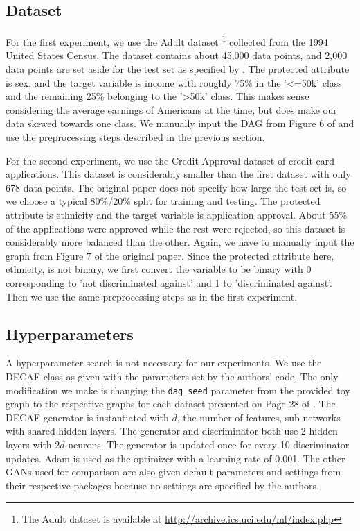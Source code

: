 \subsection{Dataset}

For the first experiment, we use the Adult dataset \footnote{The Adult dataset is available at \url{http://archive.ics.uci.edu/ml/index.php}} \citep{Dua:2019} collected from the 1994 United States Census. The dataset contains about 45,000 data points, and 2,000 data points are set aside for the test set as specified by \citep{DBLP:conf/nips/BreugelKBS21}. The protected attribute is sex, and the target variable is income with roughly 75\% in the '<=50k' class and the remaining 25\% belonging to the '>50k' class. This makes sense considering the average earnings of Americans at the time, but does make our data skewed towards one class. We manually input the DAG from Figure 6 of \cite{DBLP:conf/nips/BreugelKBS21} and use the preprocessing steps described in the previous section. 

For the second experiment, we use the Credit Approval dataset \citep{Dua:2019} of credit card applications. This dataset is considerably smaller than the first dataset with only 678 data points. The original paper does not specify how large the test set is, so we choose a typical 80\%/20\% split for training and testing. The protected attribute is ethnicity and the target variable is application approval. About 55\% of the applications were approved while the rest were rejected, so this dataset is considerably more balanced than the other. Again, we have to manually input the graph from Figure 7 of the original paper. Since the protected attribute here, ethnicity, is not binary, we first convert the variable to be binary with 0 corresponding to 'not discriminated against' and 1 to 'discriminated against'. Then we use the same preprocessing steps as in the first experiment. 

\subsection{Hyperparameters}

A hyperparameter search is not necessary for our experiments. We use the DECAF class as given with the parameters set by the authors' code. The only modification we make is changing the \texttt{dag\_seed} parameter from the provided toy graph to the respective graphs for each dataset presented on Page 28 of \citep{DBLP:conf/nips/BreugelKBS21}. The DECAF generator is instantiated with $d$, the number of features, sub-networks with shared hidden layers. The generator and discriminator both use 2 hidden layers with $2d$ neurons. The generator is updated once for every 10 discriminator updates. Adam is used as the optimizer with a learning rate of 0.001. The other GANs used for comparison are also given default parameters and settings from their respective packages because no settings are specified by the authors. 

